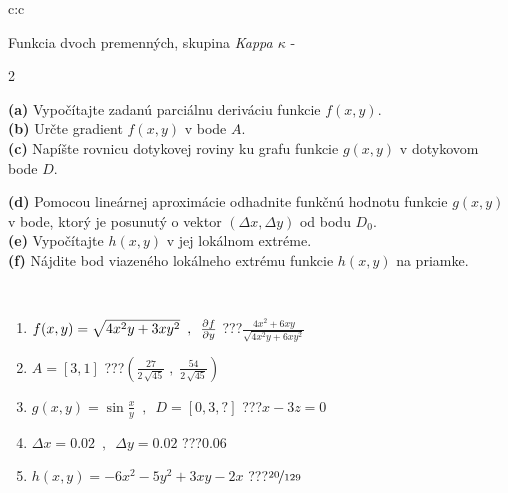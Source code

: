 \documentclass[10pt]{report}
\begin{document}
\begin{tabular}{c:c}
\begin{minipage}[c][104.5mm][t]{0.5\linewidth}
\begin{center}
\vspace{7mm}
{\huge \LARGE Funkcia dvoch premenných, skupina \textit{Kappa $\kappa$} -}\\[5mm]
\begin{minipage}{0.95\linewidth}
\begin{center}
{\small \begin{multicols}{2} \raggedright
\textbf{(a)} Vypočítajte zadanú parciálnu deriváciu funkcie \(f(x,y)\). \\[1mm]
\textbf{(b)} Určte gradient \(f(x,y)\) v bode \(A\). \\[1mm]
\textbf{(c)} Napíšte rovnicu dotykovej roviny ku grafu funkcie \(g(x,y)\) v dotykovom bode \(D\). \par \columnbreak
\textbf{(d)} Pomocou lineárnej aproximácie odhadnite funkčnú hodnotu funkcie \(g(x,y)\) v bode, ktorý je posunutý o vektor \((\Delta x, \Delta y)\) od bodu \(D_0\). \\[1mm]
\textbf{(e)} Vypočítajte \(h(x,y)\) v jej lokálnom extréme. \\[1mm]
\textbf{(f)} Nájdite bod viazeného lokálneho extrému funkcie \(h(x,y)\) na priamke. \\[1mm]
\end{multicols}
}
\end{center}
\end{minipage}
\\[4mm]
\begin{minipage}{0.79\linewidth}
\begin{center}
\begin{varwidth}{\linewidth}
\begin{enumerate}
\normalsizerr
\item $f(x,y) = \sqrt{4x^2y + 3xy^2}\enspace , \enspace \pdv{f}{y}$\quad \dotfill\; ???\;\dotfill \quad $\frac{4x^2+6xy}{\sqrt{4x^2y+6xy^2}}$
\item $A = [3, 1]$\quad \dotfill\; ???\;\dotfill \quad $\left( \frac{27}{2\,\sqrt{45}} \;,\; \frac{54}{2\,\sqrt{45}} \right)$
\item $g(x,y) = \sin\frac{x}{y} \enspace , \enspace D = [0, 3, ?]$\quad \dotfill\; ???\;\dotfill \quad $x-3z=0$
\item $\Delta x = {0.02} \enspace,\enspace \Delta y = {0.02}$\quad \dotfill\; ???\;\dotfill \quad $0.06$
\item $h(x,y) = -6x^2-5y^2+3xy-2x$\quad \dotfill\; ???\;\dotfill \quad $\nicefrac{20}{129}$

\end{enumerate}
\end{varwidth}
\end{center}
\end{minipage}
\end{center}
\end{minipage}
\end{tabular}
\end{document}
